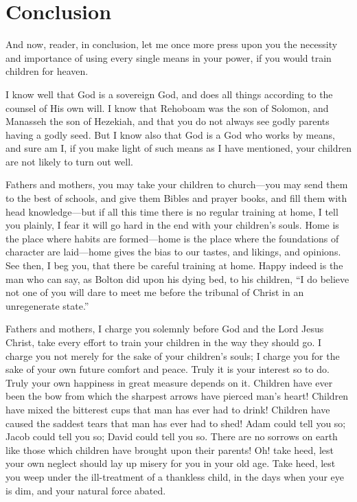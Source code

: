 \documentclass[
]{book}
\begin{document}
\hypertarget{conclusion}{%
\chapter*{Conclusion}\label{conclusion}}

And now, reader, in conclusion, let me once more press upon you the necessity and importance of using every single means in your power, if you would train children for heaven.

I know well that God is a sovereign God, and does all things according to the counsel of His own will. I know that Rehoboam was the son of Solomon, and Manasseh the son of Hezekiah, and that you do not always see godly parents having a godly seed. But I know also that God is a God who works by means, and sure am I, if you make light of such means as I have mentioned, your children are not likely to turn out well.

Fathers and mothers, you may take your children to church---you may send them to the best of schools, and give them Bibles and prayer books, and fill them with head knowledge---but if all this time there is no regular training at home, I tell you plainly, I fear it will go hard in the end with your children's souls. Home is the place where habits are formed---home is the place where the foundations of character are laid---home gives the bias to our tastes, and likings, and opinions. See then, I beg you, that there be careful training at home. Happy indeed is the man who can say, as Bolton did upon his dying bed, to his children, ``I do believe not one of you will dare to meet me before the tribunal of Christ in an unregenerate state.''

Fathers and mothers, I charge you solemnly before God and the Lord Jesus Christ, take every effort to train your children in the way they should go. I charge you not merely for the sake of your children's souls; I charge you for the sake of your own future comfort and peace. Truly it is your interest so to do. Truly your own happiness in great measure depends on it. Children have ever been the bow from which the sharpest arrows have pierced man's heart! Children have mixed the bitterest cups that man has ever had to drink! Children have caused the saddest tears that man has ever had to shed! Adam could tell you so; Jacob could tell you so; David could tell you so. There are no sorrows on earth like those which children have brought upon their parents! Oh! take heed, lest your own neglect should lay up misery for you in your old age. Take heed, lest you weep under the ill-treatment of a thankless child, in the days when your eye is dim, and your natural force abated.
\end{document}
